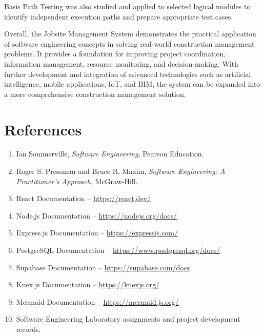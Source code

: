 \documentclass[11pt,a4paper]{article}
\newcommand{\hdrtitle}{Final Project Report}
\newcommand{\jpartend}[1]{\stopcontents[part#1]}
\begin{document}
Basis Path Testing was also studied and applied to selected logical modules to identify independent execution paths and prepare appropriate test cases.

Overall, the Jobsite Management System demonstrates the practical application of software engineering concepts in solving real-world construction management problems. It provides a foundation for improving project coordination, information management, resource monitoring, and decision-making. With further development and integration of advanced technologies such as artificial intelligence, mobile applications, IoT, and BIM, the system can be expanded into a more comprehensive construction management solution.
\jpartend{IX}

\clearpage
\renewcommand{\hdrtitle}{References}
\section*{References}
\begin{enumerate}[itemsep=3pt]
\item Ian Sommerville, \textit{Software Engineering}, Pearson Education.
\item Roger S. Pressman and Bruce R. Maxim, \textit{Software Engineering: A Practitioner's Approach}, McGraw-Hill.
\item React Documentation -- \url{https://react.dev/}
\item Node.js Documentation -- \url{https://nodejs.org/docs/}
\item Express.js Documentation -- \url{https://expressjs.com/}
\item PostgreSQL Documentation -- \url{https://www.postgresql.org/docs/}
\item Supabase Documentation -- \url{https://supabase.com/docs}
\item Knex.js Documentation -- \url{https://knexjs.org/}
\item Mermaid Documentation -- \url{https://mermaid.js.org/}
\item Software Engineering Laboratory assignments and project development records.
\end{enumerate}
\end{document}
